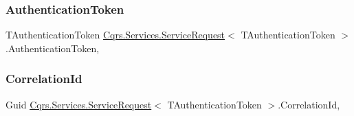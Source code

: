 \subsubsection{\texorpdfstring{Authentication\+Token}{AuthenticationToken}}
{\footnotesize\ttfamily T\+Authentication\+Token \hyperlink{classCqrs_1_1Services_1_1ServiceRequest}{Cqrs.\+Services.\+Service\+Request}$<$ T\+Authentication\+Token $>$.Authentication\+Token\hspace{0.3cm}{\ttfamily [get]}, {\ttfamily [set]}}

\mbox{\label{classCqrs_1_1Services_1_1ServiceRequest_abbf7a905744ac65ab59edf4f550cad61}} 
\subsubsection{\texorpdfstring{Correlation\+Id}{CorrelationId}}
{\footnotesize\ttfamily Guid \hyperlink{classCqrs_1_1Services_1_1ServiceRequest}{Cqrs.\+Services.\+Service\+Request}$<$ T\+Authentication\+Token $>$.Correlation\+Id\hspace{0.3cm}{\ttfamily [get]}, {\ttfamily [set]}}

